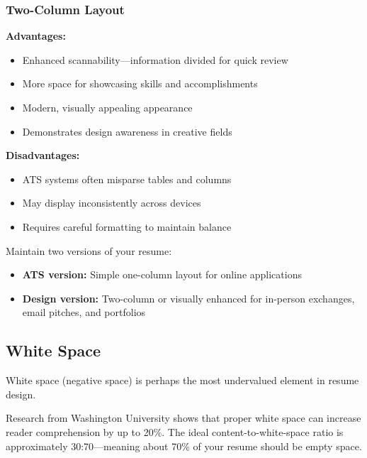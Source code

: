 \documentclass[11pt,a4paper]{article}
\begin{document}
\subsubsection{Two-Column Layout}

\textbf{Advantages:}
\begin{itemize}
    \item Enhanced scannability---information divided for quick review
    \item More space for showcasing skills and accomplishments
    \item Modern, visually appealing appearance
    \item Demonstrates design awareness in creative fields
\end{itemize}

\textbf{Disadvantages:}
\begin{itemize}
    \item ATS systems often misparse tables and columns
    \item May display inconsistently across devices
    \item Requires careful formatting to maintain balance
\end{itemize}

\begin{bestpractice}
Maintain two versions of your resume:
\begin{itemize}[noitemsep]
    \item \textbf{ATS version:} Simple one-column layout for online applications
    \item \textbf{Design version:} Two-column or visually enhanced for in-person exchanges, email pitches, and portfolios
\end{itemize}
\end{bestpractice}

\subsection{White Space}

White space (negative space) is perhaps the most undervalued element in resume design.

\begin{keystat}
Research from Washington University shows that proper white space can increase reader comprehension by up to 20\%. The ideal content-to-white-space ratio is approximately 30:70---meaning about 70\% of your resume should be empty space.
\end{keystat}
\end{document}
